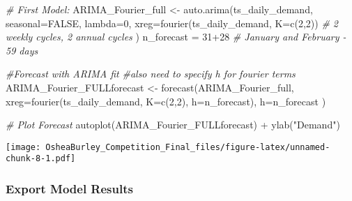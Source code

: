 \documentclass[
]{article}
\newenvironment{Shaded}{\begin{snugshade}}{\end{snugshade}}
\newcommand{\AttributeTok}[1]{\textcolor[rgb]{0.77,0.63,0.00}{#1}}
\newcommand{\CommentTok}[1]{\textcolor[rgb]{0.56,0.35,0.01}{\textit{#1}}}
\newcommand{\ConstantTok}[1]{\textcolor[rgb]{0.00,0.00,0.00}{#1}}
\newcommand{\DecValTok}[1]{\textcolor[rgb]{0.00,0.00,0.81}{#1}}
\newcommand{\FunctionTok}[1]{\textcolor[rgb]{0.00,0.00,0.00}{#1}}
\newcommand{\NormalTok}[1]{#1}
\newcommand{\OtherTok}[1]{\textcolor[rgb]{0.56,0.35,0.01}{#1}}
\newcommand{\SpecialCharTok}[1]{\textcolor[rgb]{0.00,0.00,0.00}{#1}}
\newcommand{\StringTok}[1]{\textcolor[rgb]{0.31,0.60,0.02}{#1}}
\begin{document}
\begin{Shaded}
\begin{Highlighting}[]
\CommentTok{\# First Model: }
\NormalTok{ARIMA\_Fourier\_full }\OtherTok{\textless{}{-}} \FunctionTok{auto.arima}\NormalTok{(ts\_daily\_demand, }
                             \AttributeTok{seasonal=}\ConstantTok{FALSE}\NormalTok{, }
                             \AttributeTok{lambda=}\DecValTok{0}\NormalTok{,}
                             \AttributeTok{xreg=}\FunctionTok{fourier}\NormalTok{(ts\_daily\_demand, }
                                          \AttributeTok{K=}\FunctionTok{c}\NormalTok{(}\DecValTok{2}\NormalTok{,}\DecValTok{2}\NormalTok{)) }\CommentTok{\# 2 weekly cycles, 2 annual cycles}
\NormalTok{                             )}
\NormalTok{n\_forecast }\OtherTok{=} \DecValTok{31}\SpecialCharTok{+}\DecValTok{28} \CommentTok{\# January and February {-} 59 days}

\CommentTok{\#Forecast with ARIMA fit}
\CommentTok{\#also need to specify h for fourier terms}
\NormalTok{ARIMA\_Fourier\_FULLforecast }\OtherTok{\textless{}{-}} \FunctionTok{forecast}\NormalTok{(ARIMA\_Fourier\_full,}
                           \AttributeTok{xreg=}\FunctionTok{fourier}\NormalTok{(ts\_daily\_demand,}
                                        \AttributeTok{K=}\FunctionTok{c}\NormalTok{(}\DecValTok{2}\NormalTok{,}\DecValTok{2}\NormalTok{),}
                                        \AttributeTok{h=}\NormalTok{n\_forecast),}
                           \AttributeTok{h=}\NormalTok{n\_forecast}
\NormalTok{                           ) }

\CommentTok{\# Plot Forecast}
\FunctionTok{autoplot}\NormalTok{(ARIMA\_Fourier\_FULLforecast) }\SpecialCharTok{+} \FunctionTok{ylab}\NormalTok{(}\StringTok{"Demand"}\NormalTok{)}
\end{Highlighting}
\end{Shaded}

\texttt{[image: OsheaBurley\_Competition\_Final\_files/figure-latex/unnamed-chunk-8-1.pdf]}

\hypertarget{export-model-results}{%
\subsubsection{Export Model Results}\label{export-model-results}}

\begin{Shaded}
\end{Shaded}
\end{document}
